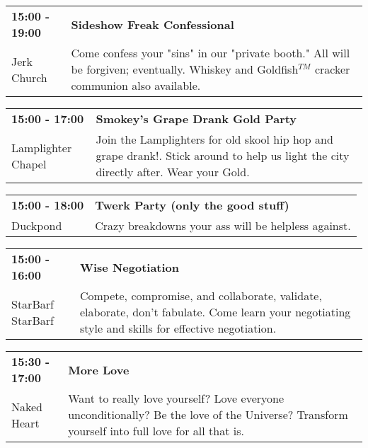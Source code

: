 \begin{tabular}{ p{1in} p{2.2in} }
    \textbf{15:00 - 19:00} & \textbf{Sideshow Freak Confessional} \\
    Jerk Church \newline  & Come confess your "sins" in our "private booth." All will be forgiven; eventually. Whiskey and Goldfish$^{TM}$ cracker communion also available. \\
    \hline 
\end{tabular}
    
\begin{tabular}{ p{1in} p{2.2in} }
    \textbf{15:00 - 17:00} & \textbf{Smokey's Grape Drank Gold Party} \\
    Lamplighter Chapel \newline  & Join the Lamplighters for old skool hip hop and grape drank!. Stick around to help us light the city directly after. Wear your Gold. \\
    \hline 
\end{tabular}
    
\begin{tabular}{ p{1in} p{2.2in} }
    \textbf{15:00 - 18:00} & \textbf{Twerk Party (only the good stuff)} \\
    Duckpond \newline  & Crazy breakdowns your ass will be helpless against. \\
    \hline 
\end{tabular}
    
\begin{tabular}{ p{1in} p{2.2in} }
    \textbf{15:00 - 16:00} & \textbf{Wise Negotiation} \\
    StarBarf \newline StarBarf & Compete, compromise, and collaborate, validate, elaborate, don't fabulate. Come learn your negotiating style and skills for effective negotiation. \\
    \hline 
\end{tabular}
    
\begin{tabular}{ p{1in} p{2.2in} }
    \textbf{15:30 - 17:00} & \textbf{More Love} \\
    Naked Heart \newline  & Want to really love yourself? Love everyone unconditionally? Be the love of the Universe? Transform yourself into full love for all that is. \\
    \hline 
\end{tabular}
    
